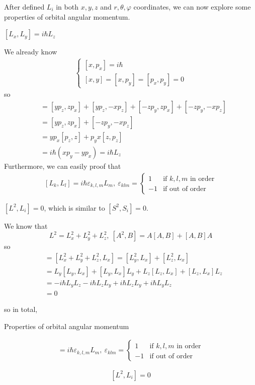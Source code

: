 \documentclass[UTF8,12pt]{article} %
\makeatletter
\numberwithin{equation}{section}
\newenvironment{proof}[1][\protect\proofname]{\par
\normalfont\topsep6\p@\@plus6\p@\relax
\trivlist
\itemindent\parindent
\item[\hskip\labelsep
\scshape
#1]\ignorespaces
}{%
\endtrivlist\@endpefalse
}
\renewcommand{\proofname}{\it{Solution}}
\makeatother
\begin{document}
After defined $L_{i}$ in both $x,y,z$ and $r,\theta, \varphi$ coordinates, we can now explore some properties of orbital angular momentum.
\begin{enumerate*}
\item $[L_{x}, L_{y}] = i\hbar L_{z}$
\begin{proof}[Proof]
We already know
\begin{align}
\begin{cases}
[x, p_{x}] = i\hbar \\
[x,y] = [x,p_{y}] = [p_{x}, p_{y}] = 0
\end{cases}
\end{align}
so
\begin{align}
[yp_{z} - zp_{y}, zp_{x} - xp_{z}] &= [yp_{z}, zp_{x}] + [yp_{z}, -xp_{z}] + [-zp_{y}, zp_{x}] + [-zp_{y}, -xp_{z}] \\
&= [yp_{z}, zp_{x}] + [-zp_{y}, -xp_{z}] \\
&= yp_{x}[p_{z},z] + p_{y}x[z,p_{z}] \\
&= i\hbar\left(xp_{y} - yp_{x}\right) = i\hbar L_{z}
\end{align}
\end{proof}
Furthermore, we can easily proof that 
\begin{align}
\boxed{[L_{k}, L_{l}] = i\hbar\varepsilon_{k,l,m}L_{m},~ \varepsilon_{klm} = \begin{cases}1&\text{if }k,l,m\text{ in order}\\-1&\text{if out of order}\end{cases}}
\end{align}
\item $\boxed{[L^{2}, L_{i}] = 0}$, which is similar to $[S^{2}, S_{i}] = 0$.
\begin{proof}[Proof]
We know that
$$L^{2} = L_{x}^{2} + L_{y}^{2} + L_{z}^{2},~ [A^{2},B] = A[A,B] + [A,B]A$$
so
\begin{align}
[L^{2}, L_{x}] &= [L_{x}^{2} + L_{y}^{2} + L_{z}^{2}, L_{x}] = [L_{y}^{2}, L_{x}] + [L_{z}^{2}, L_{x}] \\
&= L_{y}[L_{y}, L_{x}] + [L_{y}, L_{x}]L_{y} + L_{z}[L_{z}, L_{x}] + [L_{z}, L_{x}]L_{z} \\
&= -i\hbar L_{y}L_{z} -i\hbar L_{z}L_{y} + i\hbar L_{z}L_{y} + i\hbar L_{y}L_{z} \\
&= 0
\end{align}
\end{proof}
\end{enumerate*}
so in total,
\begin{myboxes}{Properties of orbital angular momentum}{}
\begin{enumerate*}
\item \begin{align*}
[L_{k}, L_{l}] = i\hbar\varepsilon_{k,l,m}L_{m},~ \varepsilon_{klm} = \begin{cases}1&\text{if }k,l,m\text{ in order}\\-1&\text{if out of order}\end{cases}
\end{align*}
\item $$[L^{2}, L_{i}] = 0$$
\end{enumerate*}
\end{myboxes}
\end{document}
